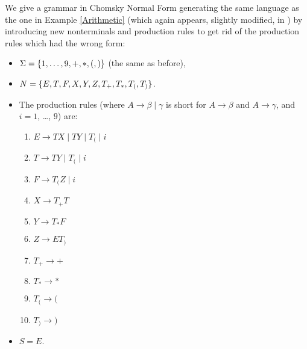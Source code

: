 \begin{Example}
  \label{CNF-Ex}
  We give a grammar in Chomsky Normal Form generating the same language as the one in Example \ref{Arithmetic} (which again appears, slightly modified, in \citep{Lange-Leiss}) by introducing new nonterminals and production rules to get rid of the production rules which had the wrong form:
  \begin{itemize}
  \item $\Sigma = \{1,\ldots , 9, +, *, (, )\}$ (the same as before),
  \item $N = \{E, T, F, X, Y, Z, T_+, T_*, T_(, T_)\}$.
  \item The production rules (where $A \to \beta \mid \gamma$ is short for $A \to \beta$ and $A \to \gamma$, and $i = 1$, \ldots,  $9$) are:
    \begin{enumerate}
    \item$E  \to  TX \mid TY \mid T_( \mid i$
    \item$T  \to  TY \mid T_( \mid i$
    \item$F  \to  T_(Z \mid i$
    \item$X  \to  T_+T$
    \item$Y  \to  T_*F$
    \item$Z  \to  ET_)$
    \item$T_+ \to +$
    \item$T_* \to *$
    \item$T_( \to ($
    \item$T_) \to {)}$
    \end{enumerate}
  \item $S = E$.
  \end{itemize}
\end{Example}
